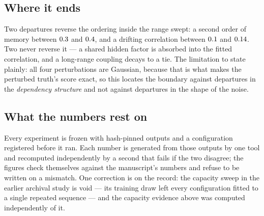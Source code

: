 \documentclass[10pt,a4paper]{article}
\begin{document}
\subsection{Where it ends} Two departures reverse the ordering inside the range swept: a second
order of memory between $0.3$ and $0.4$, and a drifting correlation
between $0.1$ and $0.14$. Two never reverse it --- a shared hidden
factor is absorbed into the fitted correlation, and a long-range coupling decays to a tie. The
limitation to state plainly: all four perturbations are Gaussian, because that is what makes the
perturbed truth's score exact, so this locates the boundary against departures in the
\emph{dependency structure} and not against departures in the shape of the noise.

\subsection{What the numbers rest on} Every experiment is frozen with hash-pinned outputs and a
configuration registered before it ran. Each number is generated from those outputs by one tool
and recomputed independently by a second that fails if the two disagree; the figures check
themselves against the manuscript's numbers and refuse to be written on a mismatch. One correction
is on the record: the capacity sweep in the earlier archival study is void --- its training draw
left every configuration fitted to a single repeated sequence --- and the capacity evidence above
was computed independently of it.
\end{document}
